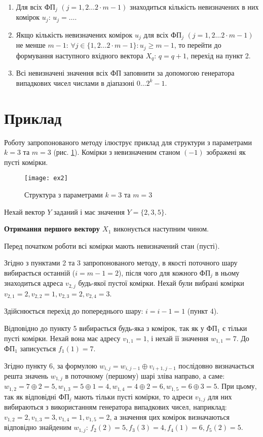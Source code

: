 \documentclass[12pt]{article}
\begin{document}
\begin{enumerate}
\item Для всіх ФП$_j$ $(j=1,2 \ldots 2 \cdot m-1)$ знаходиться кількість невизначених в них комірок $u_j$: $u_j= \ldots$.
\item Якщо кількість невизначених комірок $u_j$ для всіх ФП$_j$ $(j=1,2 \ldots 2 \cdot m-1)$ не менше $m-1$: $\forall j \in \{1,2 \ldots 2 \cdot m-1\}: u_j \geq m-1$, то перейти до формування наступного вхідного вектора $X_q$: $q=q+1$, перехід на пункт 2.
\item Всі невизначені значення всіх ФП заповнити за допомогою генератора випадкових чисел числами в діапазоні $0 \ldots 2^k-1$.
\end{enumerate}

\section{Приклад}

Роботу запропонованого методу ілюструє приклад для структури з параметрами $k=3$ та $m=3$ (рис. \ref{fig:ex1}). %
Комірки з невизначеним станом $(-1)$ зображені як пусті комірки.

\begin{figure}[h]
\centering
\texttt{[image: ex2]}
\caption{Структура з параметрами $k=3$ та $m=3$}
\label{fig:ex1}
\end{figure}

Нехай вектор $Y$ заданий і має значення $Y = \{ 2, 3, 5 \}$.

\textbf{Отримання першого вектору $X_1$} виконується наступним чином.

Перед початком роботи всі комірки мають невизначений стан (пусті).

Згідно з пунктами 2 та 3 запропонованого методу, в якості поточного шару вибирається останній ($i = m - 1 = 2$), після чого для кожного ФП$_j$ в ньому знаходиться адреса $v_{2, j}$ будь-якої пустої комірки. Нехай були вибрані комірки $v_{2,1}=2, v_{2,2}=1, v_{2,3}=2, v_{2,4}=3$.

Здійснюється перехід до попереднього шару: $i = i - 1 = 1$ (пункт 4).

Відповідно до пункту 5 вибирається будь-яка з комірок, так як у ФП$_1$ є тільки пусті комірки.
Нехай вона має адресу $v_{1,1}=1$, і нехай її значення $w_{1,1}=7$.
До ФП$_1$ записується $f_1(1)=7$.

Згідно пункту 6, за формулою $w_{i,j} = w_{i,j-1} \oplus v_{i+1,j-1}$ послідовно визначається решта значень $w_{1,j}$ в поточному (першому) шарі зліва направо, а саме: $w_{1,2} = 7 \oplus 2 = 5, w_{1,3} = 5 \oplus 1 = 4, w_{1,4} = 4 \oplus 2 = 6, w_{1,5} = 6 \oplus 3 = 5$.
При цьому, так як відповідні ФП$_j$ мають тільки пусті комірки, то адреси $v_{1,j}$ для них вибираються з використанням генератора випадкових чисел, наприклад: $v_{1,2} = 2, v_{1,3} = 3, v_{1,4} = 1, v_{1,5} = 2$, а значення цих комірок визначаються відповідно знайденим $w_{1,j}$: $f_2(2)=5, f_3(3)=4, f_4(1)=6, f_5(2)=5$.
\end{document}
